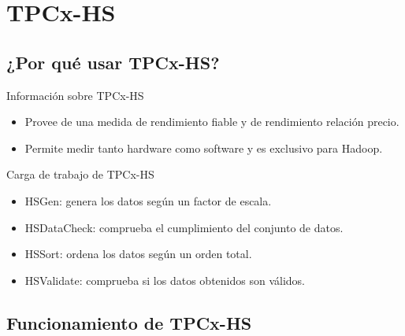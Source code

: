 
\section{TPCx-HS}

	\subsection*{¿Por qué usar TPCx-HS?}

		\begin{frame}{Información sobre TPCx-HS}
			\begin{itemize}
				\item Provee de una medida de rendimiento fiable y de rendimiento relación precio.
				\item Permite medir tanto hardware como software y es exclusivo para Hadoop.
			\end{itemize}
			
			\color{ChetwodeBlue}\large Carga de trabajo de TPCx-HS
			
			\begin{itemize}
				\item HSGen: genera los datos según un factor de escala.
				\item HSDataCheck: comprueba el cumplimiento del conjunto de datos.
				\item HSSort: ordena los datos según un orden total.
				\item HSValidate: comprueba si los datos obtenidos son válidos.
			\end{itemize}		
		\end{frame}
	
	\subsection*{Funcionamiento de TPCx-HS}	

